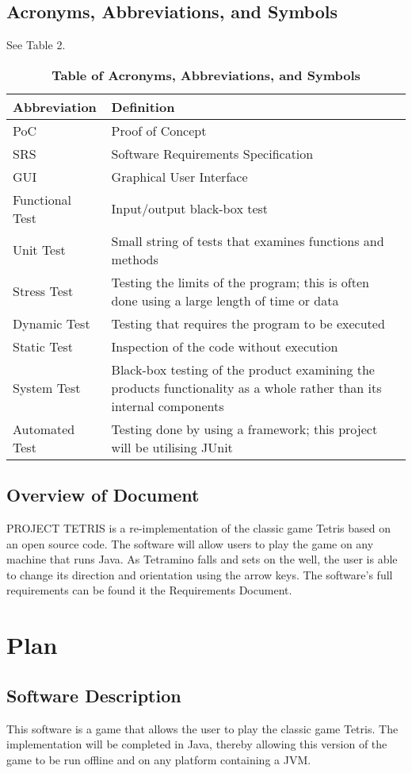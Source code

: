 \documentclass[12pt, titlepage]{article}
\begin{document}
\subsection{Acronyms, Abbreviations, and Symbols}
See Table 2.
\begin{table}[!h]
\caption{\textbf{Table of Acronyms, Abbreviations, and Symbols}} \label{Table}
\begin{tabularx}{\textwidth}{p{3cm}X}
\toprule
\textbf{Abbreviation} & \textbf{Definition} \\
\midrule
PoC & Proof of Concept\\
SRS & Software Requirements Specification\\
GUI & Graphical User Interface\\
Functional Test & Input/output black-box test\\
Unit Test & Small string of tests that examines functions and methods\\
Stress Test & Testing the limits of the program; this is often done using a large length of time or data\\
Dynamic Test & Testing that requires the program to be executed\\
Static Test & Inspection of the code without execution\\
System Test & Black-box testing of the product examining the products functionality as a whole rather than its internal components\\
Automated Test & Testing done by using a framework; this project will be utilising JUnit \\
\bottomrule
\end{tabularx}
\end{table}

\subsection{Overview of Document}
PROJECT TETRIS is a re-implementation of the classic game Tetris based on an open source code. The software will allow users to play the game on any machine that runs Java. As Tetramino falls and sets on the well, the user is able to change its direction and orientation using the arrow keys. The software's full requirements can be found it the Requirements Document.
\section{Plan}
	
\subsection{Software Description}
This software is a game that allows the user to play the classic game Tetris. The implementation will be completed in Java, thereby allowing this version of the game to be run offline and on any platform containing a JVM.
\end{document}
